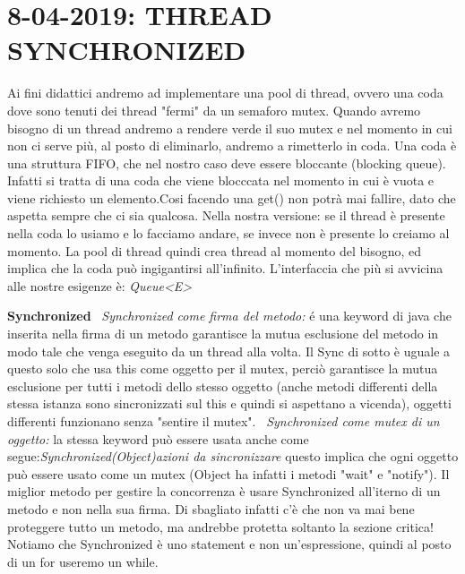 

\newpage
\section{8-04-2019: THREAD SYNCHRONIZED}

\noindent Ai fini didattici andremo ad implementare una pool di thread, ovvero una coda dove sono tenuti dei thread "fermi" da un semaforo mutex. Quando avremo bisogno di un thread andremo a rendere verde il suo mutex e nel momento in cui non ci serve più, al posto di eliminarlo, andremo a rimetterlo in coda. \newline
Una coda è una struttura FIFO, che nel nostro caso deve essere bloccante (blocking queue). Infatti si tratta di una coda che viene blocccata nel momento in cui è vuota e viene richiesto un elemento.Cosi facendo una get() non potrà mai fallire, dato che aspetta sempre che ci sia qualcosa. \newline
Nella nostra versione: se il thread è presente nella coda lo usiamo e lo facciamo andare, se invece non è presente lo creiamo al momento. La pool di thread quindi crea thread al momento del bisogno, ed implica che la coda può ingigantirsi all'infinito. \newline
L'interfaccia che più si avvicina alle nostre esigenze è: \textit{Queue<E>} 


\noindent \textbf{Synchronized} \newline
\textbullet\ \textit{Synchronized come firma del metodo:} é una keyword di java che inserita nella firma di un metodo garantisce la mutua esclusione del metodo in modo tale che venga eseguito da un thread alla volta. Il Sync di sotto è uguale a questo solo che usa this come oggetto per il mutex, perciò garantisce la mutua esclusione per tutti i metodi dello stesso oggetto (anche metodi differenti della stessa istanza sono sincronizzati sul this e quindi si aspettano a vicenda), oggetti differenti funzionano senza "sentire il mutex".\newline
\textbullet\ \textit{Synchronized come mutex di un oggetto:} la stessa keyword può essere usata anche come segue:\textit{Synchronized(Object){azioni da sincronizzare}} questo implica che ogni oggetto può essere usato come un mutex (Object ha infatti i metodi "wait" e "notify"). \newline
Il miglior metodo per gestire la concorrenza è usare Synchronized all'iterno di un metodo e non nella sua firma. \newline
Di sbagliato infatti c'è che non va mai bene proteggere tutto un metodo, ma andrebbe protetta soltanto la sezione critica!
Notiamo che Synchronized è uno statement e non un'espressione, quindi al posto di un for useremo un while.

